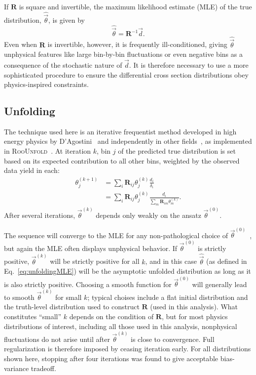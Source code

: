If $\mathbf{R}$ is square and invertible, the maximum likelihood estimate (MLE) of the true distribution, $\hat{\vec{\theta}}$, is given by
\begin{equation}\label{eq:unfoldingMLE}
  \hat{\vec{\theta}} = \mathbf{R}^{-1}\vec{d}.
\end{equation}
Even when $\mathbf{R}$ is invertible, however, it is frequently ill-conditioned, giving $\hat{\vec{\theta}}$ unphysical features like large bin-by-bin fluctuations or even negative bins as a consequence of the stochastic nature of $\vec{d}$.
It is therefore necessary to use a more sophisticated procedure to ensure the differential cross section distributions obey physics-inspired constraints.

\subsection{Unfolding}

The technique used here is an iterative frequentist method developed in high energy physics by D'Agostini~\cite{DAgostini:1994fjx} and independently in other fields~\cite{Dempster:10.2307/2984875,Lucy:1974AJ,Richardson:72,Shepp:4307558}, as implemented in \textsc{RooUnfold}~\cite{Adye:2011gm}.
At iteration $k$, bin $j$ of the predicted true distribution is set based on its expected contribution to all other bins, weighted by the observed data yield in each:
\begin{equation}
  \begin{split}
    \theta_j^{(k+1)} & = \sum_i \mathbf{R}_{ij} \theta_j^{(k)} \frac{d_i}{\delta_i} \\
    & = \sum_i \mathbf{R}_{ij} \theta_j^{(k)} \frac{d_i}{\sum_m \mathbf{R}_{im} \theta_m^{(k)}}.
  \end{split}
\end{equation}
After several iterations, $\vec{\theta}^{(k)}$ depends only weakly on the ansatz $\vec{\theta}^{(0)}$.

The sequence will converge to the MLE for any non-pathological choice of $\vec{\theta}^{(0)}$~\cite{vardi1985}, but again the MLE often displays unphysical behavior.
If $\vec{\theta}^{(0)}$ is strictly positive, $\vec{\theta}^{(k)}$ will be strictly positive for all $k$, and in this case $\hat{\vec{\theta}}$ (as defined in Eq.~\ref{eq:unfoldingMLE}) will be the asymptotic unfolded distribution as long as it is also strictly positive.
Choosing a smooth function for $\vec{\theta}^{(0)}$ will generally lead to smooth $\vec{\theta}^{(k)}$ for small $k$; typical choises include a flat initial distribution and the truth-level distribution used to construct $\mathbf{R}$ (used in this analysis).
What constitutes ``small'' $k$ depends on the condition of $\mathbf{R}$, but for most physics distributions of interest, including all those used in this analysis, nonphysical fluctuations do not arise until after $\vec{\theta}^{(k)}$ is close to convergence.
Full regularization is therefore imposed by ceasing iteration early.
For all distributions shown here, stopping after four iterations was found to give acceptable bias-variance tradeoff.

